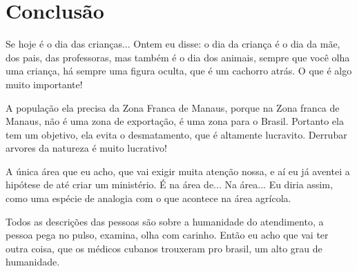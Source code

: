 \documentclass[12pt, a4paper]{article}
\begin{document}
\section{Conclusão}
Se hoje é o dia das crianças... Ontem eu disse: o dia da criança é o dia da mãe, dos pais, das professoras, mas também é o dia dos animais, sempre que você olha uma criança, há sempre uma figura oculta, que é um cachorro atrás. O que é algo muito importante!

A população ela precisa da Zona Franca de Manaus, porque na Zona franca de Manaus, não é uma zona de exportação, é uma zona para o Brasil. Portanto ela tem um objetivo, ela evita o desmatamento, que é altamente lucravito. Derrubar arvores da natureza é muito lucrativo!

A única área que eu acho, que vai exigir muita atenção nossa, e aí eu já aventei a hipótese de até criar um ministério. É na área de... Na área... Eu diria assim, como uma espécie de analogia com o que acontece na área agrícola.

Todos as descrições das pessoas são sobre a humanidade do atendimento, a pessoa pega no pulso, examina, olha com carinho. Então eu acho que vai ter outra coisa, que os médicos cubanos trouxeram pro brasil, um alto grau de humanidade.
\end{document}

